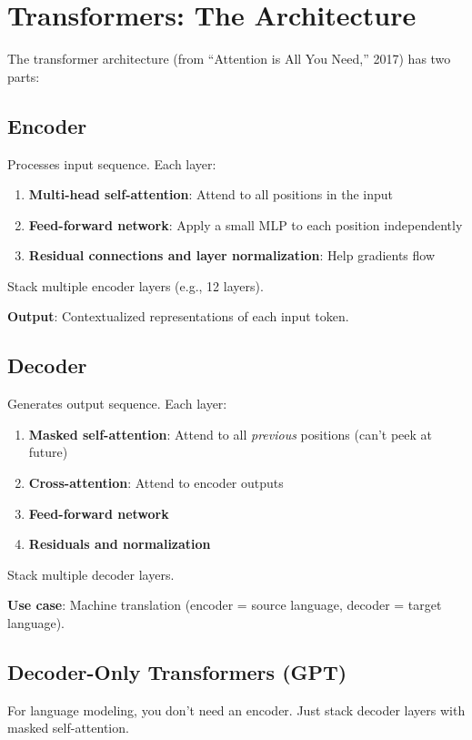 \section{Transformers: The Architecture}

The transformer architecture (from ``Attention is All You Need,'' 2017) has two parts:

\subsection{Encoder}
Processes input sequence. Each layer:
\begin{enumerate}
\item \textbf{Multi-head self-attention}: Attend to all positions in the input
\item \textbf{Feed-forward network}: Apply a small MLP to each position independently
\item \textbf{Residual connections and layer normalization}: Help gradients flow
\end{enumerate}

Stack multiple encoder layers (e.g., 12 layers).

\textbf{Output}: Contextualized representations of each input token.

\subsection{Decoder}
Generates output sequence. Each layer:
\begin{enumerate}
\item \textbf{Masked self-attention}: Attend to all \textit{previous} positions (can't peek at future)
\item \textbf{Cross-attention}: Attend to encoder outputs
\item \textbf{Feed-forward network}
\item \textbf{Residuals and normalization}
\end{enumerate}

Stack multiple decoder layers.

\textbf{Use case}: Machine translation (encoder = source language, decoder = target language).

\subsection{Decoder-Only Transformers (GPT)}

For language modeling, you don't need an encoder. Just stack decoder layers with masked self-attention.

